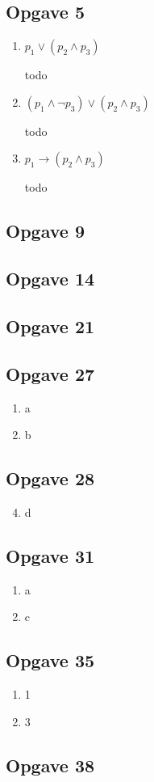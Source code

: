 \documentclass[11pt]{article}
\begin{document}
%

\subsection*{Opgave 5}
\begin{enumerate}[label=\alph*]
  \item $p_1 \vee (p_2 \wedge p_3)$

  todo

  \item $(p_1 \wedge \neg p_3) \vee (p_2 \wedge p_3)$

  todo

  \item $p_1 \rightarrow (p_2 \wedge p_3)$

  todo

\end{enumerate}


\subsection*{Opgave 9}
\subsection*{Opgave 14}
\subsection*{Opgave 21}
\subsection*{Opgave 27}
\begin{enumerate}[label=\alph*]
  \item a
  \item b
\end{enumerate}
\subsection*{Opgave 28}
\begin{enumerate}[label=\alph*]
  \setcounter{enumi}{3}
  \item d
\end{enumerate}
\subsection*{Opgave 31}
\begin{enumerate}[label=\alph*]
  \item a
  \setcounter{enumi}{2}
  \item c
\end{enumerate}
\subsection*{Opgave 35}
\begin{enumerate}
  \item 1
  \setcounter{enumi}{2}
  \item 3
\end{enumerate}
\subsection*{Opgave 38}
\end{document}
